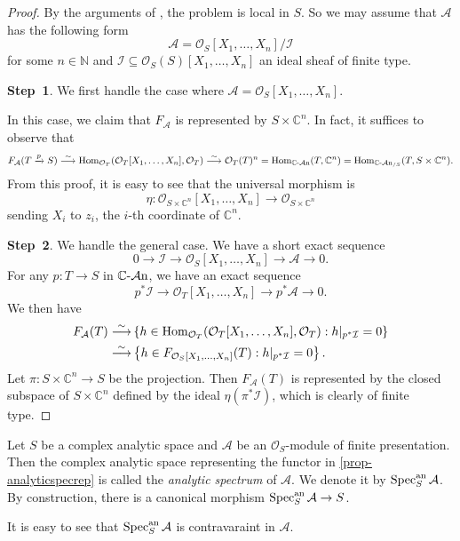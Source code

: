 \begin{proof}
    By the arguments of \cite[\href{https://stacks.math.columbia.edu/tag/01JJ}{Tag 01JJ}]{stacks-project}, the problem is local in $S$. So we may assume that $\mathcal{A}$ has the following form
    \[
        \mathcal{A}=\mathcal{O}_S[X_1,\ldots,X_n]/\mathcal{I}
    \]   
    for some $n\in \mathbb{N}$ and $\mathcal{I}\subseteq \mathcal{O}_S(S)[X_1,\ldots,X_n]$ an ideal sheaf of finite type. 
    
    \textbf{Step~1}. We first handle the case where $\mathcal{A}=\mathcal{O}_S[X_1,\ldots,X_n]$.

    In this case, we claim that $F_{\mathcal{A}}$ is represented by $S\times \mathbb{C}^n$. In fact, it suffices to observe that 
    \[
        F_{\mathcal{A}}(T\xrightarrow{p} S)\stackrel{\sim}{\longrightarrow} \operatorname{Hom}_{\mathcal{O}_T}(\mathcal{O}_T[X_1,\ldots,X_n],\mathcal{O}_T)\stackrel{\sim}{\longrightarrow} \mathcal{O}_T(T)^n = \operatorname{Hom}_{\mathbb{C}\text{-}\mathcal{A}\mathrm{n}}(T,\mathbb{C}^n)=\operatorname{Hom}_{\mathbb{C}\text{-}\mathcal{A}\mathrm{n}_{/S}}(T,S\times \mathbb{C}^n).
    \]
    From this proof, it is easy to see that the universal morphism is 
    \[
        \eta:\mathcal{O}_{S\times \mathbb{C}^n}[X_1,\ldots,X_n]\rightarrow \mathcal{O}_{S\times \mathbb{C}^n}
    \]
    sending $X_i$ to $z_i$, the $i$-th coordinate of $\mathbb{C}^n$.

    \textbf{Step~2}. We handle the general case.
    We have a short exact sequence
    \[
        0\rightarrow \mathcal{I}\rightarrow \mathcal{O}_S[X_1,\ldots,X_n]\rightarrow \mathcal{A}\rightarrow 0.
    \]    
    For any $p:T\rightarrow S$ in $\mathbb{C}\text{-}\mathcal{A}\mathrm{n}$, we have an exact sequence
    \[
        p^*\mathcal{I}\rightarrow \mathcal{O}_T[X_1,\ldots,X_n]\rightarrow p^*\mathcal{A}\rightarrow 0.
    \]
    We then have
    \[
        \begin{aligned}
        F_{\mathcal{A}}(T)\stackrel{\sim}{\longrightarrow} & \left\{ h\in \operatorname{Hom}_{\mathcal{O}_T}(\mathcal{O}_T[X_1,\ldots,X_n],\mathcal{O}_T): h|_{p^*\mathcal{I}}=0  \right\}\\
        \stackrel{\sim}{\longrightarrow} & \left\{ h\in F_{\mathcal{O}_S[X_1,\ldots,X_n]}(T): h|_{p^*\mathcal{I}}=0  \right\}.
        \end{aligned}
    \]
    Let $\pi:S\times \mathbb{C}^n\rightarrow S$ be the projection. Then $F_{\mathcal{A}}(T)$ is represented by the closed subspace of $S\times \mathbb{C}^n$ defined by the ideal $\eta(\pi^* \mathcal{I})$, which is clearly of finite type.


    
\end{proof}

\begin{definition}
    Let $S$ be a complex analytic space and $\mathcal{A}$ be an $\mathcal{O}_S$-module of finite presentation. Then the complex analytic space representing the functor in \cref{prop-analyticspecrep} is called the \emph{analytic spectrum} of $\mathcal{A}$. We denote it by $\operatorname{Spec}^{\mathrm{an}}_S \mathcal{A}$. By construction, there is a canonical morphism $\operatorname{Spec}^{\mathrm{an}}_S \mathcal{A}\rightarrow S$.
\end{definition}
It is easy to see that $\operatorname{Spec}^{\mathrm{an}}_S \mathcal{A}$ is contravaraint in $\mathcal{A}$.

